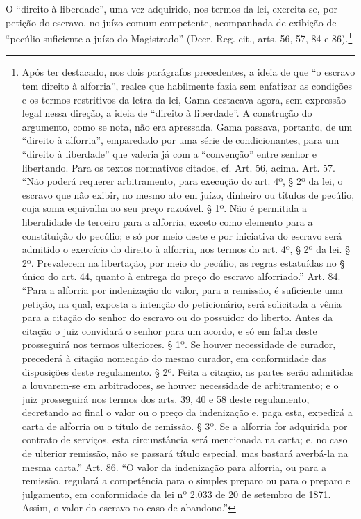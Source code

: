 {O ``direito à liberdade'', uma vez adquirido, nos termos da lei,
exercita-se, por petição do escravo, no juízo comum competente,
acompanhada de exibição de ``pecúlio suficiente a juízo do Magistrado''
(Decr. Reg. cit., arts. 56, 57, 84 e 86).\footnote{Após ter destacado,
  nos dois parágrafos precedentes, a ideia de que ``o escravo tem direito
  à alforria'', realce que habilmente fazia sem enfatizar as condições e
  os termos restritivos da letra da lei, Gama destacava agora, sem
  expressão legal nessa direção, a ideia de ``direito à liberdade''. A
  construção do argumento, como se nota, não era apressada. Gama
  passava, portanto, de um ``direito à alforria'', emparedado por uma série
  de condicionantes, para um ``direito à liberdade'' que valeria já com a
  ``convenção'' entre senhor e libertando. Para os textos normativos
  citados, cf. Art. 56, acima. Art. 57. ``Não
  poderá requerer arbitramento, para execução do art. 4º, § 2º da lei, o
  escravo que não exibir, no mesmo ato em juízo, dinheiro ou títulos de
  pecúlio, cuja soma equivalha ao seu preço razoável. § 1º. Não é
  permitida a liberalidade de terceiro para a alforria, exceto como
  elemento para a constituição do pecúlio; e só por meio deste e por
  iniciativa do escravo será admitido o exercício do direito à alforria,
  nos termos do art. 4º, § 2º da lei. § 2º. Prevalecem na libertação,
  por meio do pecúlio, as regras estatuídas no § único do art. 44,
  quanto à entrega do preço do escravo alforriado.'' Art. 84. ``Para a
  alforria por indenização do valor, para a remissão, é suficiente uma
  petição, na qual, exposta a intenção do peticionário, será solicitada
  a vênia para a citação do senhor do escravo ou do possuidor do
  liberto. Antes da citação o juiz convidará o senhor para um acordo, e
  só em falta deste prosseguirá nos termos ulteriores. § 1º. Se houver
  necessidade de curador, precederá à citação nomeação do mesmo curador,
  em conformidade das disposições deste regulamento. § 2º. Feita a
  citação, as partes serão admitidas a louvarem-se em arbitradores, se
  houver necessidade de arbitramento; e o juiz prosseguirá nos termos
  dos arts. 39, 40 e 58 deste regulamento, decretando ao final o valor
  ou o preço da indenização e, paga esta, expedirá a carta de alforria
  ou o título de remissão. § 3º. Se a alforria for adquirida por
  contrato de serviços, esta circunstância será mencionada na carta; e,
  no caso de ulterior remissão, não se passará título especial, mas
  bastará averbá-la na mesma carta.'' Art. 86. ``O valor da indenização para
  alforria, ou para a remissão, regulará a competência para o simples
  preparo ou para o preparo e julgamento, em conformidade da lei nº
  2.033 de 20 de setembro de 1871. Assim, o valor do escravo no caso de
  abandono.''}

}
